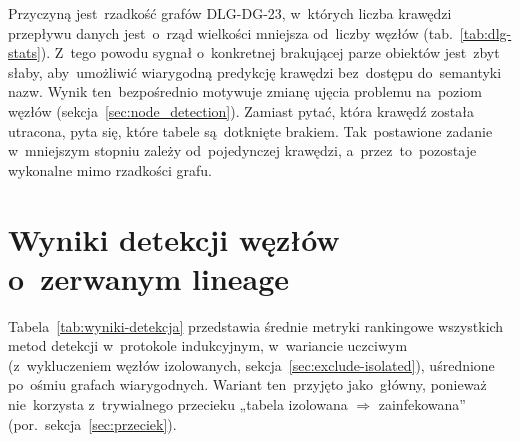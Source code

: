 \documentclass[polish,master,a4paper,oneside]{ppfcmthesis}
\renewcommand{\_}{\origtextunderscore\ifmmode\else\allowbreak\fi}
\begin{document}
Przyczyną jest~rzadkość grafów DLG-DG-23, w~których liczba krawędzi przepływu
danych jest~o~rząd wielkości mniejsza od~liczby węzłów (tab.~\ref{tab:dlg-stats}).
Z~tego powodu sygnał o~konkretnej brakującej parze obiektów jest~zbyt słaby,
aby~umożliwić wiarygodną predykcję krawędzi bez~dostępu do~semantyki nazw.
Wynik ten~bezpośrednio motywuje zmianę ujęcia problemu
na~poziom węzłów (sekcja~\ref{sec:node_detection}). Zamiast pytać, która
krawędź została utracona, pyta się, które tabele są~dotknięte brakiem.
Tak~postawione zadanie w~mniejszym stopniu zależy od~pojedynczej krawędzi,
a~przez~to~pozostaje wykonalne mimo rzadkości grafu.

\section{Wyniki detekcji węzłów o~zerwanym lineage}
\label{sec:wyniki}

Tabela~\ref{tab:wyniki-detekcja} przedstawia średnie metryki rankingowe
wszystkich metod detekcji w~protokole indukcyjnym, w~wariancie uczciwym
(z~wykluczeniem węzłów izolowanych, sekcja~\ref{sec:exclude-isolated}),
uśrednione po~ośmiu grafach wiarygodnych. Wariant ten~przyjęto jako~główny,
ponieważ nie~korzysta z~trywialnego przecieku „tabela izolowana $\Rightarrow$
zainfekowana'' (por.~sekcja~\ref{sec:przeciek}).
\end{document}
